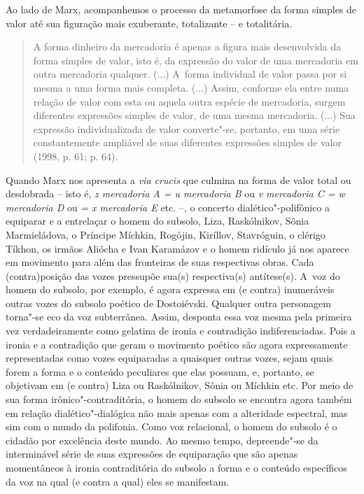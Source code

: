 {Ao lado de Marx, acompanhemos o processo da metamorfose da forma simples
de valor até sua figuração mais exuberante, totalizante -- e
totalitária.

\begin{quote}
A forma dinheiro da mercadoria é apenas a figura mais desenvolvida da
forma simples de valor, isto é, da expressão do valor de uma mercadoria
em outra mercadoria qualquer. (...) A~forma individual de valor passa
por si mesma a uma forma mais completa. (...) Assim, conforme ela entre
numa relação de valor com esta ou aquela outra espécie de mercadoria,
surgem diferentes expressões simples de valor, de uma mesma mercadoria.
(...) Sua expressão individualizada de valor converte"-se, portanto, em
uma série constantemente ampliável de suas diferentes expressões simples
de valor (1998, p. 61; p. 64).
\end{quote}

Quando Marx nos apresenta a \emph{via crucis} que culmina na forma de
valor total ou desdobrada -- isto é, \emph{z mercadoria A = u mercadoria
B} ou \emph{v mercadoria C = w mercadoria D} ou \emph{= x mercadoria E}
etc. --, o concerto dialético"-polifônico a equiparar e a entrelaçar o
homem do subsolo, Liza, Raskólnikov, Sônia Marmieládova, o Príncipe
Míchkin, Rogójin, Kiríllov, Stavróguin, o clérigo Tíkhon, os irmãos
Aliócha e Ivan Karamázov e o homem ridículo já nos aparece em movimento
para além das fronteiras de suas respectivas obras. Cada (contra)posição
das vozes pressupõe sua(s) respectiva(s) antítese(s). A~voz do homem do
subsolo, por exemplo, é agora expressa em (e contra) inumeráveis outras
vozes do subsolo poético de Dostoiévski. Qualquer outra personagem
torna"-se eco da voz subterrânea. Assim, desponta essa voz mesma pela
primeira vez verdadeiramente como gelatina de ironia e contradição
indiferenciadas. Pois a ironia e a contradição que geram o movimento
poético são agora expressamente representadas como vozes equiparadas a
quaisquer outras vozes, sejam quais forem a forma e o conteúdo
peculiares que elas possuam, e, portanto, se objetivam em (e contra)
Liza ou Raskólnikov, Sônia ou Míchkin etc. Por meio de sua forma
irônico"-contraditória, o homem do subsolo se encontra agora também em
relação dialético"-dialógica não mais apenas com a alteridade espectral,
mas sim com o mundo da polifonia. Como voz relacional, o homem do
subsolo é o cidadão por excelência deste mundo. Ao mesmo tempo,
depreende"-se da interminável série de suas expressões de equiparação que
são apenas momentâneos à ironia contraditória do subsolo a forma e o
conteúdo específicos da voz na qual (e contra a qual) eles se
manifestam.

}
